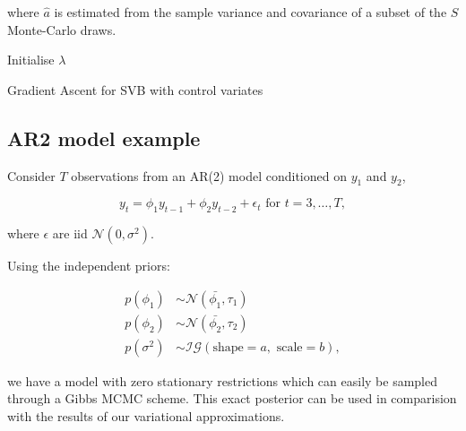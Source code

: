 \documentclass{article}\usepackage[]{graphicx}\usepackage[]{color}
\numberwithin{equation}{section}
\begin{document}
where $\hat{a}$ is estimated from the sample variance and covariance of a subset of the $S$ Monte-Carlo draws.

\begin{algorithm}[H]
 Initialise $\lambda$\;
 \caption{Gradient Ascent for SVB with control variates}
  \label{alg:algorithm4}
\end{algorithm}
  
\subsection{AR2 model example}

Consider $T$ observations from an AR(2) model conditioned on $y_1$ and $y_2$,

\begin{equation}
\label{AR2}
y_t = \phi_1 y_{t-1} + \phi_2 y_{t-2} + \epsilon_t \mbox{ for } t = 3,\dots,T,
\end{equation}

where $\epsilon$ are iid $\mathcal{N}(0, \sigma^2)$.

Using the independent priors: 

\begin{align}
p(\phi_1) &\sim \mathcal{N}(\bar{\phi_1}, \tau_{1}) \nonumber \\
p(\phi_2) &\sim \mathcal{N}(\bar{\phi_2}, \tau_{2}) \nonumber \\
p(\sigma^2) &\sim \mathcal{IG} (\mbox{shape} = a, \mbox{ scale} = b), \nonumber
\end{align}

we have a model with zero stationary restrictions which can easily be sampled through a Gibbs MCMC scheme. This exact posterior can be used in comparision with the results of our variational approximations.
\end{document}
